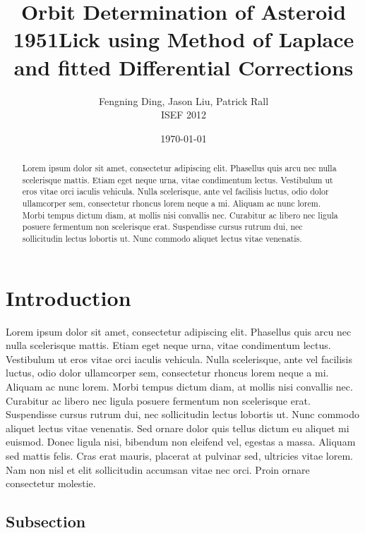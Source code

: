 \documentclass[11pt,a4paper]{article}
\title{Orbit Determination of Asteroid 1951Lick using Method of Laplace and fitted Differential Corrections}
\author{Fengning Ding, Jason Liu, Patrick Rall \\ ISEF 2012}
\date{\today}
\begin{document}
\maketitle
\thispagestyle{empty}
\pagestyle{fancy}

\begin{abstract}
Lorem ipsum dolor sit amet, consectetur adipiscing elit. Phasellus quis arcu nec nulla scelerisque mattis. Etiam eget neque urna, vitae condimentum lectus. Vestibulum ut eros vitae orci iaculis vehicula. Nulla scelerisque, ante vel facilisis luctus, odio dolor ullamcorper sem, consectetur rhoncus lorem neque a mi. Aliquam ac nunc lorem. Morbi tempus dictum diam, at mollis nisi convallis nec. Curabitur ac libero nec ligula posuere fermentum non scelerisque erat. Suspendisse cursus rutrum dui, nec sollicitudin lectus lobortis ut. Nunc commodo aliquet lectus vitae venenatis.
\end{abstract}

\tableofcontents

\clearpage

\setlength{\parskip}{2ex plus 1.5ex minus 1.5ex}


\section{Introduction}

Lorem ipsum dolor sit amet, consectetur adipiscing elit. Phasellus quis arcu nec nulla scelerisque mattis. Etiam eget neque urna, vitae condimentum lectus. Vestibulum ut eros vitae orci iaculis vehicula. Nulla scelerisque, ante vel facilisis luctus, odio dolor ullamcorper sem, consectetur rhoncus lorem neque a mi. Aliquam ac nunc lorem. Morbi tempus dictum diam, at mollis nisi convallis nec. Curabitur ac libero nec ligula posuere fermentum non scelerisque erat. Suspendisse cursus rutrum dui, nec sollicitudin lectus lobortis ut. Nunc commodo aliquet lectus vitae venenatis. Sed ornare dolor quis tellus dictum eu aliquet mi euismod. Donec ligula nisi, bibendum non eleifend vel, egestas a massa. Aliquam sed mattis felis. Cras erat mauris, placerat at pulvinar sed, ultricies vitae lorem. Nam non nisl et elit sollicitudin accumsan vitae nec orci. Proin ornare consectetur molestie.

\subsection{Subsection}
\end{document}

